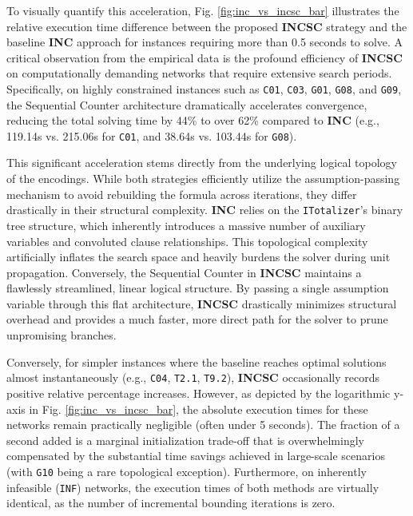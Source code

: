 \documentclass[letterpaper,journal]{IEEEtran}
\begin{document}
To visually quantify this acceleration, Fig. \ref{fig:inc_vs_incsc_bar} illustrates the relative execution time difference between the proposed \textbf{INCSC} strategy and the baseline \textbf{INC} approach for instances requiring more than 0.5 seconds to solve. A critical observation from the empirical data is the profound efficiency of \textbf{INCSC} on computationally demanding networks that require extensive search periods. Specifically, on highly constrained instances such as \texttt{C01}, \texttt{C03}, \texttt{G01}, \texttt{G08}, and \texttt{G09}, the Sequential Counter architecture dramatically accelerates convergence, reducing the total solving time by 44\% to over 62\% compared to \textbf{INC} (e.g., 119.14s vs. 215.06s for \texttt{C01}, and 38.64s vs. 103.44s for \texttt{G08}).

This significant acceleration stems directly from the underlying logical topology of the encodings. While both strategies efficiently utilize the assumption-passing mechanism to avoid rebuilding the formula across iterations, they differ drastically in their structural complexity. \textbf{INC} relies on the \texttt{ITotalizer}'s binary tree structure, which inherently introduces a massive number of auxiliary variables and convoluted clause relationships. This topological complexity artificially inflates the search space and heavily burdens the solver during unit propagation. Conversely, the Sequential Counter in \textbf{INCSC} maintains a flawlessly streamlined, linear logical structure. By passing a single assumption variable through this flat architecture, \textbf{INCSC} drastically minimizes structural overhead and provides a much faster, more direct path for the solver to prune unpromising branches.

Conversely, for simpler instances where the baseline reaches optimal solutions almost instantaneously (e.g., \texttt{C04}, \texttt{T2.1}, \texttt{T9.2}), \textbf{INCSC} occasionally records positive relative percentage increases. However, as depicted by the logarithmic y-axis in Fig. \ref{fig:inc_vs_incsc_bar}, the absolute execution times for these networks remain practically negligible (often under 5 seconds). The fraction of a second added is a marginal initialization trade-off that is overwhelmingly compensated by the substantial time savings achieved in large-scale scenarios (with \texttt{G10} being a rare topological exception). Furthermore, on inherently infeasible (\texttt{INF}) networks, the execution times of both methods are virtually identical, as the number of incremental bounding iterations is zero. 
\end{document}
